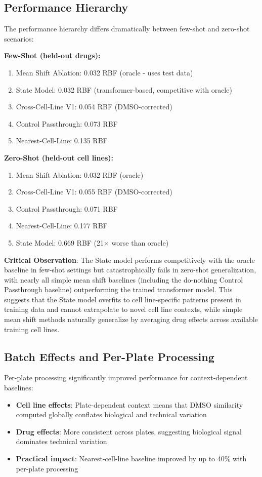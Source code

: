 \documentclass[conference]{IEEEtran}
\begin{document}
\subsection{Performance Hierarchy}

The performance hierarchy differs dramatically between few-shot and zero-shot scenarios:

\textbf{Few-Shot (held-out drugs):}
\begin{enumerate}
    \item Mean Shift Ablation: 0.032 RBF (oracle - uses test data)
    \item State Model: 0.032 RBF (transformer-based, competitive with oracle)
    \item Cross-Cell-Line V1: 0.054 RBF (DMSO-corrected)
    \item Control Passthrough: 0.073 RBF
    \item Nearest-Cell-Line: 0.135 RBF
\end{enumerate}

\textbf{Zero-Shot (held-out cell lines):}
\begin{enumerate}
    \item Mean Shift Ablation: 0.032 RBF (oracle)
    \item Cross-Cell-Line V1: 0.055 RBF (DMSO-corrected)
    \item Control Passthrough: 0.071 RBF
    \item Nearest-Cell-Line: 0.177 RBF
    \item State Model: 0.669 RBF (21× worse than oracle)
\end{enumerate}

\textbf{Critical Observation}: The State model performs competitively with the oracle baseline in few-shot settings but catastrophically fails in zero-shot generalization, with nearly all simple mean shift baselines (including the do-nothing Control Passthrough baseline) outperforming the trained transformer model. This suggests that the State model overfits to cell line-specific patterns present in training data and cannot extrapolate to novel cell line contexts, while simple mean shift methods naturally generalize by averaging drug effects across available training cell lines.

\subsection{Batch Effects and Per-Plate Processing}

Per-plate processing significantly improved performance for context-dependent baselines:
\begin{itemize}
    \item \textbf{Cell line effects}: Plate-dependent context means that DMSO similarity computed globally conflates biological and technical variation
    \item \textbf{Drug effects}: More consistent across plates, suggesting biological signal dominates technical variation
    \item \textbf{Practical impact}: Nearest-cell-line baseline improved by up to 40\% with per-plate processing
\end{itemize}
\end{document}
